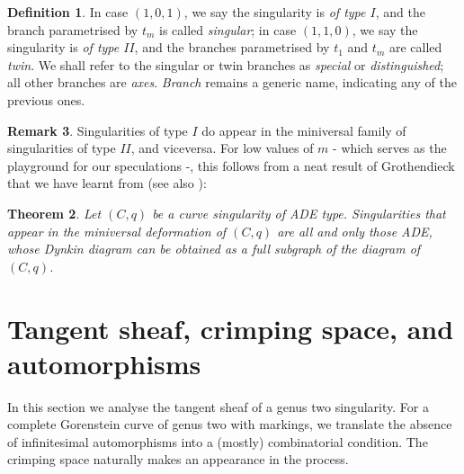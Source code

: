 \documentclass[11pt]{amsart}
\theoremstyle{plain}
\newtheorem{thm}{Theorem}[section]
\theoremstyle{definition}
\newtheorem{dfn}[thm]{Definition}
\newtheorem{rem}[thm]{Remark}
\begin{document}

\begin{dfn}\label{def:special_branches}
 In case $(1,0,1)$, we say the singularity is \emph{of type $I$}, and the branch parametrised by $t_m$ is called \emph{singular}; in case $(1,1,0)$, we say the singularity is \emph{of type $I\!I$}, and the branches parametrised by $t_1$ and $t_m$ are called \emph{twin}. We shall refer to the singular or twin branches as \emph{special} or \emph{distinguished}; all other branches are \emph{axes}. \emph{Branch} remains a generic name, indicating any of the previous ones.
\end{dfn}

\begin{rem}
 Singularities of type $I$ do appear in the miniversal family of singularities of type $I\!I$, and viceversa. For low values of $m$ - which serves as the playground for our speculations -, this follows from a neat result of Grothendieck that we have learnt from \cite{C-ML} (see also \cite{Arnold,Demazure}):
 \begin{thm}\label{thm:ADE}
  Let $(C,q)$ be a curve singularity of ADE type. Singularities that appear in the miniversal deformation of $(C,q)$ are all and only those ADE, whose Dynkin diagram can be obtained as a full subgraph of the diagram of $(C,q)$.
 \end{thm}
\end{rem}


\section{Tangent sheaf, crimping space, and automorphisms}\label{sec:crimp}
In this section we analyse the tangent sheaf of a genus two singularity. For a complete Gorenstein curve of genus two with markings, we translate the absence of infinitesimal automorphisms into a (mostly) combinatorial condition. The crimping space naturally makes an appearance in the process.
\end{document}
